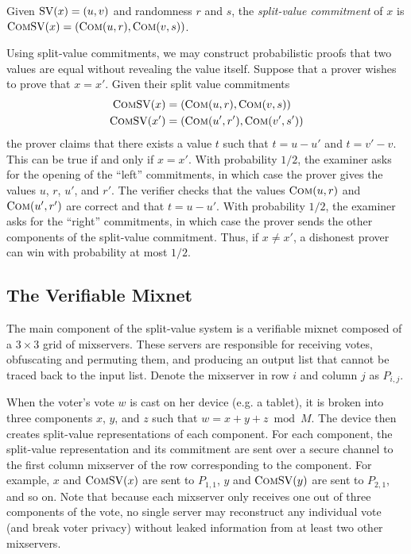 \begin{definition}
Given $\text{SV}(x) = (u, v)$ and randomness $r$ and $s$, the \emph{split-value commitment} of $x$ is $\text{C}\textsc{om}\text{SV}(x) = (\text{C}\textsc{om}(u, r), \text{C}\textsc{om}(v, s))$.
\end{definition}

Using split-value commitments, we may construct probabilistic proofs that two values are equal without revealing the value itself. Suppose that a prover wishes to prove that $x = x'$. Given their split value commitments
\begin{align*}
\text{C}\textsc{om}\text{SV}(x) &= (\text{C}\textsc{om}(u, r), \text{C}\textsc{om}(v, s)) \\
\text{C}\textsc{om}\text{SV}(x') &= (\text{C}\textsc{om}(u', r'), \text{C}\textsc{om}(v', s'))
\end{align*}
the prover claims that there exists a value $t$ such that $t = u - u'$ and $t = v' - v$. This can be true if and only if $x = x'$. With probability $1/2$, the examiner asks for the opening of the ``left'' commitments, in which case the prover gives the values $u$, $r$, $u'$, and $r'$. The verifier checks that the values $\text{C}\textsc{om}(u, r)$ and $\text{C}\textsc{om}(u', r')$ are correct and that $t = u - u'$. With probability $1/2$, the examiner asks for the ``right'' commitments, in which case the prover sends the other components of the split-value commitment. Thus, if $x \neq x'$, a dishonest prover can win with probability at most $1/2$.

\subsection{The Verifiable Mixnet}

The main component of the split-value system is a verifiable mixnet composed of a $3 \times 3$ grid of mixservers. These servers are responsible for receiving votes, obfuscating and permuting them, and producing an output list that cannot be traced back to the input list. Denote the mixserver in row $i$ and column $j$ as $P_{i,j}$.

When the voter's vote $w$ is cast on her device (e.g. a tablet), it is broken into three components $x$, $y$, and $z$ such that $w = x+y+z \bmod M$. The device then creates split-value representations of each component. For each component, the split-value representation and its commitment are sent over a secure channel to the first column mixserver of the row corresponding to the component. For example, $x$ and $\text{C}\textsc{om}\text{SV}(x)$ are sent to $P_{1,1}$, $y$ and $\text{C}\textsc{om}\text{SV}(y)$ are sent to $P_{2,1}$, and so on. Note that because each mixserver only receives one out of three components of the vote, no single server may reconstruct any individual vote (and break voter privacy) without leaked information from at least two other mixservers.

